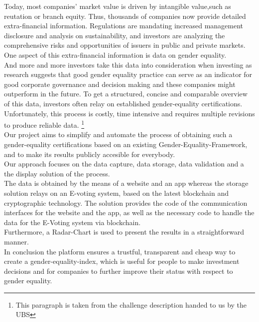 Today, most companies' market value is driven by intangible value,such as reutation or branch equity. Thus, thousands of companies now provide detailed 
extra-financial information. Regulations are mandating increased management disclosure and analysis on sustainability, and investors are analyzing the
comprehensive risks and opportunities of issuers in public and private markets. One aspect of this extra-financial information is data on gender equality.\\
And more and more investors take this data into consideration when investing as research suggests that good gender equality practice can serve as an
indicator for good corporate governance and decision making and these companies might outperform in the future.
To get a structured, concise and comparable overview of this data, investors often relay on established gender-equality certifications. Unfortunately, this process is costly, time intensive and 	requires multiple revisions to produce reliable data. \footnote{This paragraph is taken from the challenge description handed to us by the UBS}\\

Our project aims to simplify and automate the process of obtaining such a gender-equality certifications based on an existing Gender-Equality-Framework, and to make its results publicly accesible for everybody.\\
Our approach focuses on the data capture, data storage, data validation and a the display solution of the process.\\
The data is obtained by the means of a website and an app whereas the storage solution relays on an E-voting system, based on the latest blockchain and cryptographic technology. The solution provides the code of the communication interfaces for the website and the app, as well as the necessary code to handle the data for the E-Voting system via blockchain.\\ Furthermore, a Radar-Chart is used to present the results in a straightforward manner.\\

In conclusion the platform ensures a trustful, transparent and cheap way to create a gender-equality-index, which is useful for people to make investment decisions and for companies to further improve their status with respect to gender equality.